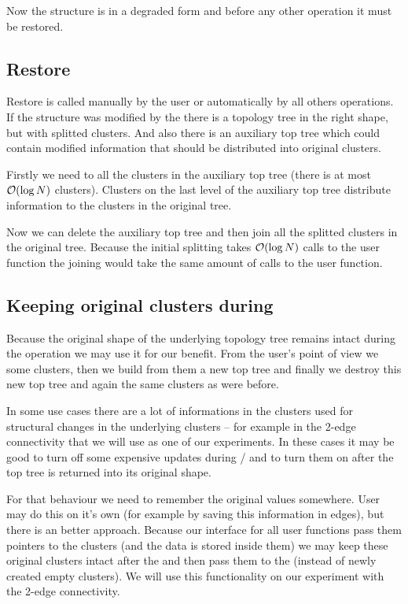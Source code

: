 Now the structure is in a degraded form and before any other operation it must
be restored.

\subsection{Restore}

Restore is called manually by the user or automatically by all others
operations. If the structure was modified by the \Expose{} there is a topology
tree in the right shape, but with splitted clusters. And also there is an
auxiliary top tree which could contain modified information that should be
distributed into original clusters.

Firstly we need to \Split{} all the clusters in the auxiliary top tree (there
is at most ${\cal O}(\log N)$ clusters). Clusters on the last level of the auxiliary
top tree distribute information to the clusters in the original tree.

Now we can delete the auxiliary top tree and then join all the splitted clusters
in the original tree. Because the initial splitting takes ${\cal O}(\log N)$ calls to
the \Split{} user function the joining would take the same amount of calls to
the \Join{} user function.

\subsection{Keeping original clusters during \Expose}

Because the original shape of the underlying topology tree remains intact during
the \Expose{} operation we may use it for our benefit. From the user's point of
view we \Split{} some clusters, then we build from them a new top tree and
finally we destroy this new top tree and \Join{} again the same clusters as were
before.

In some use cases there are a lot of informations in the clusters used for
structural changes in the underlying clusters -- for example in the 2-edge
connectivity that we will use as one of our experiments. In these cases it may be
good to turn off some expensive updates during \Join/\Split{} and to turn them
on after the top tree is returned into its original shape.

For that behaviour we need to remember the original values somewhere. User may do this
on it's own (for example by saving this information in edges), but there is an
better approach. Because our interface for all user functions pass them pointers
to the clusters (and the data is stored inside them) we may keep these original
clusters intact after the \Split{} and then pass them to the \Join{} (instead of
newly created empty clusters). We will use this functionality on our experiment
with the 2-edge connectivity.
